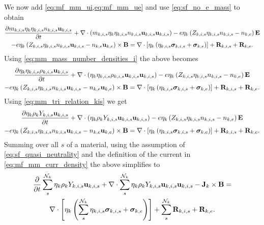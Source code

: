 \documentclass[a4paper,11pt]{report}
\begin{document}
We now add \cref{eq:mf_mm_ui,eq:mf_mm_ue} and use \cref{eq:sf_no_e_mass} to obtain
\begin{multline*}
    \frac{\partial m_{k,i,s} \eta_k \eta_{k,i,s} n_{k,i,s} \mathbf{u}_{k,i,s}}{\partial t} + \nabla \cdot \left( m_{k,i,s} \eta_k \eta_{k,i,s} n_{k,i,s} \mathbf{u}_{k,i,s} \mathbf{u}_{k,i,s} \right) -e \eta_k \left( Z_{k,i,s} \eta_{k,i,s}  n_{k,i,s} - n_{k,e} \right) \mathbf{E} \\
    - e \eta_k \left( Z_{k,i,s} \eta_{k,i,s}  n_{k,i,s} \mathbf{u}_{k,i,s} - n_{k,e} \mathbf{u}_{k,e} \right) \times \mathbf{B} = \nabla \cdot \left[ \eta_k \left( \eta_{k,i,s}  \bm \sigma_{k,i,s} + \bm \sigma_{k,e} \right) \right] + \mathbf{R}_{k,i,s} + \mathbf{R}_{k,e}.
\end{multline*}
Using \cref{eq:mm_mass_number_densities_i} the above becomes
\begin{multline*}
    \frac{\partial \eta_k \eta_{k,i,s} \rho_{k,i,s} \mathbf{u}_{k,i,s}}{\partial t} + \nabla \cdot \left( \eta_k \eta_{k,i,s} \rho_{k,i,s} \mathbf{u}_{k,i,s} \mathbf{u}_{k,i,s} \right) -e \eta_k \left( Z_{k,i,s} \eta_{k,i,s} n_{k,i,s} - n_{k,e} \right) \mathbf{E} \\
    - e \eta_k \left( Z_{k,i,s} \eta_{k,i,s} n_{k,i,s} \mathbf{u}_{k,i,s} - n_{k,e} \mathbf{u}_{k,e} \right) \times \mathbf{B} = \nabla \cdot \left[ \eta_k \left( \eta_{k,i,s} \bm \sigma_{k,i,s} + \bm \sigma_{k,e} \right) \right] + \mathbf{R}_{k,i,s} + \mathbf{R}_{k,e}.
\end{multline*}
Using \cref{eq:mm_tri_relation_kis} we get
\begin{multline*}
    \frac{\partial \eta_k \rho_k Y_{k,i,s} \mathbf{u}_{k,i,s}}{\partial t} + \nabla \cdot \left( \eta_k \rho_k Y_{k,i,s} \mathbf{u}_{k,i,s} \mathbf{u}_{k,i,s} \right) -e \eta_k \left( Z_{k,i,s} \eta_{k,i,s} n_{k,i,s} - n_{k,e} \right) \mathbf{E} \\
    - e \eta_k \left( Z_{k,i,s} \eta_{k,i,s} n_{k,i,s} \mathbf{u}_{k,i,s} - n_{k,e} \mathbf{u}_{k,e} \right) \times \mathbf{B} = \nabla \cdot \left[ \eta_k \left( \eta_{k,i,s} \bm \sigma_{k,i,s} + \bm \sigma_{k,e} \right) \right] + \mathbf{R}_{k,i,s} + \mathbf{R}_{k,e}.
\end{multline*}
Summing over all $s$ of a material, using the assumption of \cref{eq:sf_quasi_neutrality} and the definition of the current in \cref{eq:mf_mm_curr_density} the above simplifies to
\begin{multline*}
    \frac{\partial}{\partial t} \sum_s^{\mathcal{N}_k} \eta_k \rho_k Y_{k,i,s} \mathbf{u}_{k,i,s} + \nabla \cdot \sum_s^{\mathcal{N}_k} \eta_k \rho_k Y_{k,i,s} \mathbf{u}_{k,i,s} \mathbf{u}_{k,i,s} - \mathbf{J}_k \times \mathbf{B} = \\
    \nabla \cdot \left[ \eta_k \left( \sum_s^{\mathcal{N}_k} \eta_{k,i,s} \bm \sigma_{k,i,s} + \bm \sigma_{k,e} \right) \right] + \sum_s^{\mathcal{N}_k} \mathbf{R}_{k,i,s} + \mathbf{R}_{k,e}.
\end{multline*}
\end{document}
